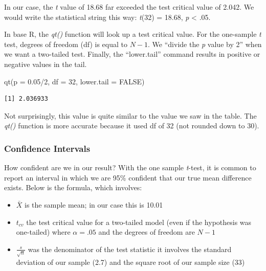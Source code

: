 \documentclass[
  11pt,
]{book}
\newenvironment{Shaded}{\begin{snugshade}}{\end{snugshade}}
\newcommand{\AttributeTok}[1]{\textcolor[rgb]{0.77,0.63,0.00}{#1}}
\newcommand{\ConstantTok}[1]{\textcolor[rgb]{0.00,0.00,0.00}{#1}}
\newcommand{\DecValTok}[1]{\textcolor[rgb]{0.00,0.00,0.81}{#1}}
\newcommand{\FloatTok}[1]{\textcolor[rgb]{0.00,0.00,0.81}{#1}}
\newcommand{\FunctionTok}[1]{\textcolor[rgb]{0.00,0.00,0.00}{#1}}
\newcommand{\NormalTok}[1]{#1}
\newcommand{\SpecialCharTok}[1]{\textcolor[rgb]{0.00,0.00,0.00}{#1}}
\providecommand{\tightlist}{%
  \setlength{\itemsep}{0pt}\setlength{\parskip}{0pt}}
\begin{document}
In our case, the \emph{t} value of 18.68 far exceeded the test critical value of 2.042. We would write the statistical string this way: \emph{t}(32) = 18.68, \emph{p} \textless{} .05.

In base R, the \emph{qt()} function will look up a test critical value. For the one-sample \emph{t} test, degrees of freedom (df) is equal to \(N-1\). We ``divide the \emph{p} value by 2'' when we want a two-tailed test. Finally, the ``lower.tail'' command results in positive or negative values in the tail.

\begin{Shaded}
\begin{Highlighting}[]
\FunctionTok{qt}\NormalTok{(}\AttributeTok{p =} \FloatTok{0.05}\SpecialCharTok{/}\DecValTok{2}\NormalTok{, }\AttributeTok{df =} \DecValTok{32}\NormalTok{, }\AttributeTok{lower.tail =} \ConstantTok{FALSE}\NormalTok{)}
\end{Highlighting}
\end{Shaded}

\begin{verbatim}
[1] 2.036933
\end{verbatim}

Not surprisingly, this value is quite similar to the value we saw in the table. The \emph{qt()} function is more accurate because it used df of 32 (not rounded down to 30).

\hypertarget{confidence-intervals}{%
\subsubsection{Confidence Intervals}\label{confidence-intervals}}

How confident are we in our result? With the one sample \emph{t}-test, it is common to report an interval in which we are 95\% confident that our true mean difference exists. Below is the formula, which involves:

\begin{itemize}
\tightlist
\item
  \(\bar{X}\) is the sample mean; in our case this is 10.01
\item
  \(t_{cv}\) the test critical value for a two-tailed model (even if the hypothesis was one-tailed) where \(\alpha = .05\) and the degrees of freedom are \(N-1\)
\item
  \(\frac{s}{\sqrt{n}}\) was the denominator of the test statistic it involves the standard deviation of our sample (2.7) and the square root of our sample size (33)
\end{itemize}
\end{document}
